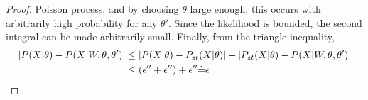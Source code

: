\begin{proof}
Poisson process, and by choosing $\theta$ large enough, this occurs
with arbitrarily high probability for any $\theta'$. Since the likelihood is bounded, the
second integral can be made arbitrarily small. Finally, from the triangle
inequality,
\begin{align*}
|P(X | \theta) - P(X | W, \theta, \theta')| &\leq |P(X | \theta) -P_{st}(X | \theta) | + | P_{st}(X | \theta) -  P(X | W, \theta, \theta')|\\
       & \leq (\epsilon'' + \epsilon'') + \epsilon'' {\doteq} \epsilon
\end{align*}

\end{proof}

